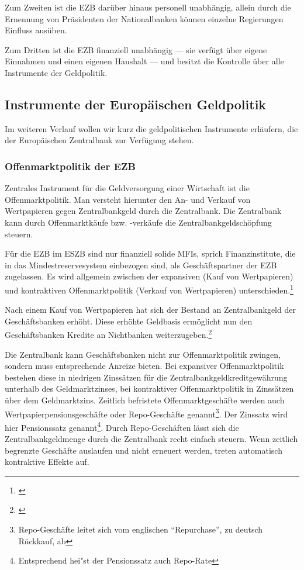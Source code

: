 \documentclass[
        onecolumn,
        a4paper,
        abstracton,
        parskip=half
        ,final
        ]{scrartcl}
\begin{document}
Zum Zweiten ist die EZB dar{\"u}ber hinaus personell unabh{\"a}ngig, allein durch die Ernennung von Pr{\"a}sidenten der Nationalbanken k{\"o}nnen einzelne Regierungen Einfluss aus{\"u}ben.

Zum Dritten ist die EZB finanziell unabh{\"a}ngig --- sie verf{\"u}gt {\"u}ber eigene Einnahmen und einen eigenen Haushalt --- und besitzt die Kontrolle {\"u}ber alle Instrumente der Geldpolitik.

\subsection{Instrumente der Europ{\"a}ischen Geldpolitik}  %

Im weiteren Verlauf wollen wir kurz die geldpolitischen Instrumente erl{\"a}ufern, die der Europ{\"a}ischen Zentralbank zur Verf{\"u}gung stehen.



\subsubsection{Offenmarktpolitik der EZB}  %

Zentrales Instrument f{\"u}r die Geldversorgung einer Wirtschaft ist die Offenmarktpolitik. Man versteht hierunter den An- und Verkauf von Wertpapieren gegen Zentralbankgeld durch die Zentralbank.
Die Zentralbank kann durch Offenmarktk{\"a}ufe bzw. -verk{\"a}ufe die Zentralbankgeldsch{\"o}pfung steuern.

F{\"u}r die EZB im \ac{ESZB} sind nur finanziell solide \ac{MFIs}, sprich Finanzinstitute, die in das Mindestreservesystem einbezogen sind, als Gesch{\"a}ftspartner der \ac{EZB} zugelassen. Es wird allgemein zwischen der expansiven (Kauf von Wertpapieren) und kontraktiven Offenmarktpolitik (Verkauf von Wertpapieren) unterschieden.\footnote[54]{\citep*[S.556]{Basseler2010}}

Nach einem Kauf von Wertpapieren hat sich der Bestand an Zentralbankgeld der Gesch{\"a}ftsbanken erh{\"o}ht. Diese erh{\"o}hte Geldbasis erm{\"o}glicht nun den Gesch{\"a}ftsbanken Kredite an Nichtbanken weiterzugeben.\footnote[55]{\citep*[S.557]{Basseler2010}}

Die Zentralbank kann Gesch{\"a}ftsbanken nicht zur Offenmarktpolitik zwingen, sondern muss entsprechende Anreize bieten. Bei expansiver Offenmarktpolitik bestehen diese in niedrigen Zinss{\"a}tzen f{\"u}r die Zentralbankgeldkreditgew{\"a}hrung unterhalb des Geldmarktzinses, bei kontraktiver Offenmarktpolitik in Zinss{\"a}tzen {\"u}ber dem Geldmarktzins.
Zeitlich befristete Offenmarktgesch{\"a}fte werden auch Wertpapierpensionsgesch{\"a}fte oder Repo-Gesch{\"a}fte genannt\footnote[36]{Repo-Gesch{\"a}fte leitet sich vom englischen "`Repurchase"', zu deutsch R{\"u}ckkauf, ab}. Der Zinssatz wird hier Pensionssatz genannt\footnote[37]{Entsprechend hei{"s}t der Pensionssatz auch Repo-Rate}.
Durch Repo-Gesch{\"a}ften l{\"a}sst sich die Zentralbankgeldmenge durch die Zentralbank recht einfach steuern. Wenn zeitlich begrenzte Gesch{\"a}fte auslaufen und nicht erneuert werden, treten automatisch kontraktive Effekte auf.
\end{document}
